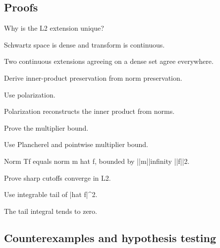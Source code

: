 \subsection*{Proofs}

\begin{exercise}\label{exr:iii13-expand-06}
Why is the L2 extension unique?
\end{exercise}
\begin{hint}
Schwartz space is dense and transform is continuous.
\end{hint}
\begin{solution}
Two continuous extensions agreeing on a dense set agree everywhere.
\end{solution}

\begin{exercise}\label{exr:iii13-expand-07}
Derive inner-product preservation from norm preservation.
\end{exercise}
\begin{hint}
Use polarization.
\end{hint}
\begin{solution}
Polarization reconstructs the inner product from norms.
\end{solution}

\begin{exercise}\label{exr:iii13-expand-08}
Prove the multiplier bound.
\end{exercise}
\begin{hint}
Use Plancherel and pointwise multiplier bound.
\end{hint}
\begin{solution}
Norm Tf equals norm m hat f, bounded by ||m||infinity ||f||2.
\end{solution}

\begin{exercise}\label{exr:iii13-expand-09}
Prove sharp cutoffs converge in L2.
\end{exercise}
\begin{hint}
Use integrable tail of |hat f|\textasciicircum{}2.
\end{hint}
\begin{solution}
The tail integral tends to zero.
\end{solution}

\subsection*{Counterexamples and hypothesis testing}

